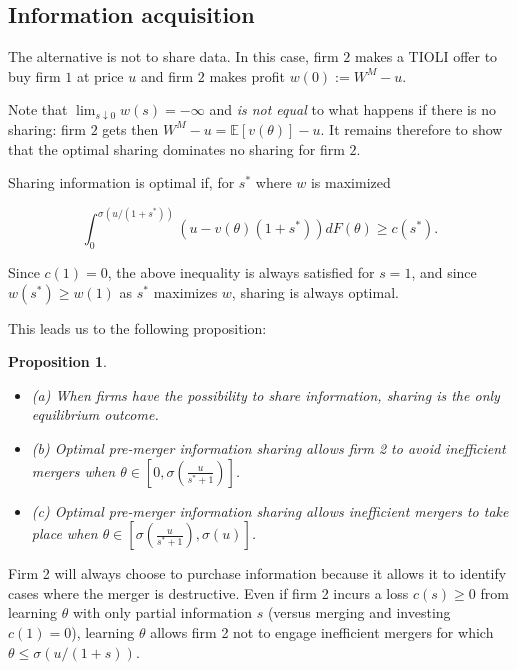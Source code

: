 \documentclass[a4paper,leqno]{article}%
\newtheorem{prop}{Proposition}
\renewcommand{\t}{\theta}
\newcommand{\E}{\mathbb E}
\renewcommand{\t}{\theta}
\newcommand{\s}{\sigma}
\begin{document}
\medskip

\subsection{Information acquisition}

The alternative is not to share data. In this case, firm $2$ makes a TIOLI offer to buy firm $1$ at price $u$ and firm $2$ makes profit $w(0):=W^M-u$.

\medskip

Note that $\lim_{s\downarrow 0}w(s)=-\infty$ and \emph{is not equal } to what happens if there is no sharing: firm $2$ gets then $W^M-u=\E[v(\t)]-u$. It remains therefore to show that the optimal sharing dominates no sharing for firm $2$. 

\medskip

Sharing information is optimal if, for $s^*$ where $w$ is maximized

\[
\int_{0}^{\s(u/(1+s^*))}(u-v(\t)(1+s^*))dF(\t)\geq c(s^*).
\]

Since $c(1)=0$, the above inequality is always satisfied for $s=1$, and since $w(s^*)\geq w(1)$ as $s^*$ maximizes $w$, sharing is always optimal.



This leads us to the following proposition:

\begin{prop}~~\label{prop:1}

\begin{itemize}
    \item (a) When firms have the possibility to share information, sharing is the only equilibrium outcome.
    \item (b) Optimal pre-merger information sharing allows firm 2 to avoid inefficient mergers when $\t\in\left[0,\s(\frac{u}{s^*+1})\right]$.
    \item (c) Optimal pre-merger information sharing allows inefficient mergers to take place when $\t\in\left[\s(\frac{u}{s^*+1}),\s(u)\right]$.
\end{itemize} 

\end{prop}

\medskip

Firm 2 will always choose to purchase information because it allows it to identify cases where the merger is destructive. Even if firm 2 incurs a loss $c(s)\geq 0$ from learning $\t$ with only partial information $s$ (versus merging and investing $c(1)=0$), learning $\t$ allows firm 2 not to engage inefficient mergers for which $\t\leq \s(u/(1+s))$. 
\end{document}
